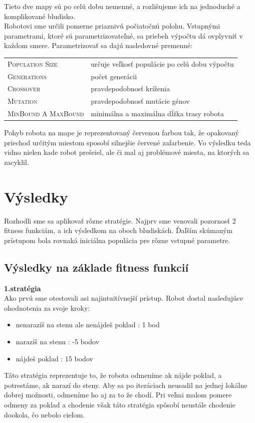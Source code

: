 \documentclass[10pt]{paper}
\begin{document}
Tieto dve mapy sú po celú dobu nemenné, a rozlišujeme ich na jednoduché a komplikované bludisko.\\
Robotovi sme určili pomerne priaznivú počiatočnú polohu. Vstupnými parametrami, ktoré sú  parametrizovateľné, sa priebeh výpočtu dá ovplyvniť v každom smere. Parametrizovať sa dajú nasledovné premenné: \\

\begin{tabular}{ll}
\hline
\textsc{Population Size} & určuje veľkosť populácie po celú dobu výpočtu \\ 
\textsc{Generations} & počet generácii \\
\textsc{Crossover}  & pravdepodobnosť kríženia  \\
\textsc{Mutation}  &  pravdepodobnosť mutácie génov  \\
\textsc{MinBound A MaxBound}  &  minimálna a maximálna dĺžka trasy robota \\ \hline
\end{tabular}

Pohyb robota na mape je reprezentovaný červenou farbou tak, že opakovaný priechod určitým miestom sposobí silnejšie červené zafarbenie. Vo výsledku teda vidno nielen kade robot prešeiel, ale či mal aj problémové miesta, na ktorých sa zacyklil.

\section{Výsledky}

Rozhodli sme sa aplikovať rôzne stratégie. Najprv sme venovali pozornosť 2 fitness funkciám, a ich výsledkom na oboch bludiskách. Ďaľším skúmaným prístupom bola rovnaká iniciálna populácia pre rôzne vstupné parametre.

\newpage

\subsection{Výsledky na základe fitness funkcií}
\textbf{1.stratégia}\\
Ako prvú sme otestovali asi najintuitívnejší prístup. Robot dostal nasledujúce ohodnotenia za svoje kroky:
\begin{itemize}
\item nenarazíš na stenu ale nenájdeš poklad : 1 bod
\item narazíš na stenu : -5 bodov
\item nájdeš poklad : 15 bodov
\end{itemize}
Táto stratégia reprezentuje to, že robota odmeníme ak nájde poklad, a potrestáme, ak narazí do steny. Aby sa po iteráciach neusadil na jednej lokálne dobrej možnosti, odmeníme ho aj za to že chodí. Pri veľmi malom pomere odmeny za poklad a chodenie však táto stratégia spôsobí neustále chodenie dookola, čo nebolo cieľom.
\end{document}

